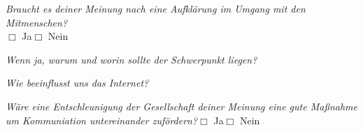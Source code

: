 \documentclass[a4paper,12pt]{scrartcl}
\newcommand{\checkbox}{\(\Box\)}
\newcommand{\frage}[1]{\textit{#1}}
\begin{document}
\newpage
\frage{Braucht es deiner Meinung nach eine Aufklärung im Umgang mit den Mitmenschen?}\\
\checkbox{} Ja\hspace{0.8cm}\checkbox{} Nein \par
\frage{Wenn ja, warum und worin sollte der Schwerpunkt liegen?}
\vspace{3cm}

\frage{Wie beeinflusst uns das Internet?}
\vspace{4cm}

\frage{Wäre eine Entschleunigung der Gesellschaft deiner Meinung eine gute Maßnahme um Kommuniation untereinander zufördern?}\hfill\checkbox{} Ja\hspace{0.8cm}\checkbox{} Nein
\end{document}
